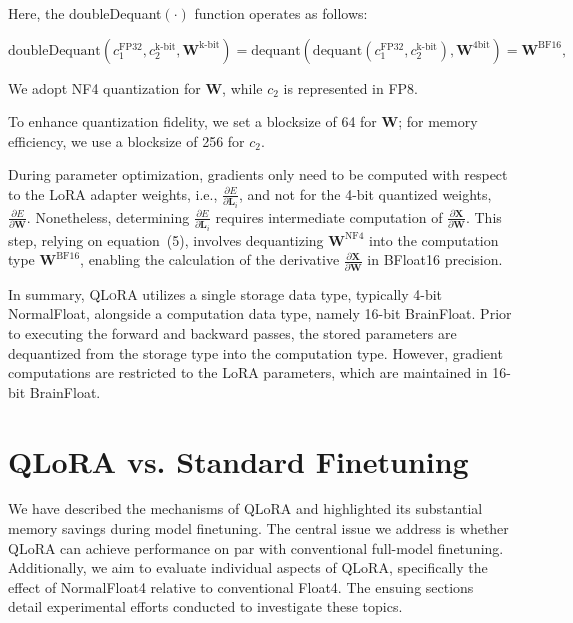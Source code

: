 Here, the doubleDequant$(\cdot)$ function operates as follows:

\begin{equation}
    \text{doubleDequant}(c_1^{\text{FP32}}, c_2^{\text{k-bit}}, \mathbf{W}^{\text{k-bit}}) = \text{dequant}(\text{dequant}(c_1^{\text{FP32}}, c_2^{\text{k-bit}}), \mathbf{W}^{\text{4bit}}) = \mathbf{W}^{\text{BF16}},
\end{equation}

We adopt NF4 quantization for $\mathbf{W}$, while $c_2$ is represented in FP8.

To enhance quantization fidelity, we set a blocksize of 64 for $\mathbf{W}$; for memory efficiency, we use a blocksize of 256 for $c_2$.

During parameter optimization, gradients only need to be computed with respect to the LoRA adapter weights, i.e., $\frac{\partial E}{\partial \mathbf{L}_i}$, and not for the 4-bit quantized weights, $\frac{\partial E}{\partial \mathbf{W}}$. Nonetheless, determining $\frac{\partial E}{\partial \mathbf{L}_i}$ requires intermediate computation of $\frac{\partial \mathbf{X}}{\partial \mathbf{W}}$. This step, relying on equation~(5), involves dequantizing $\mathbf{W}^{\text{NF4}}$ into the computation type $\mathbf{W}^{\text{BF16}}$, enabling the calculation of the derivative $\frac{\partial \mathbf{X}}{\partial \mathbf{W}}$ in BFloat16 precision.

In summary, \textsc{QLoRA} utilizes a single storage data type, typically 4-bit NormalFloat, alongside a computation data type, namely 16-bit BrainFloat. Prior to executing the forward and backward passes, the stored parameters are dequantized from the storage type into the computation type. However, gradient computations are restricted to the LoRA parameters, which are maintained in 16-bit BrainFloat.

\section{QLoRA vs. Standard Finetuning}
\label{sec:comp_to_std}

We have described the mechanisms of QLoRA and highlighted its substantial memory savings during model finetuning. The central issue we address is whether QLoRA can achieve performance on par with conventional full-model finetuning. Additionally, we aim to evaluate individual aspects of QLoRA, specifically the effect of NormalFloat4 relative to conventional Float4. The ensuing sections detail experimental efforts conducted to investigate these topics.

